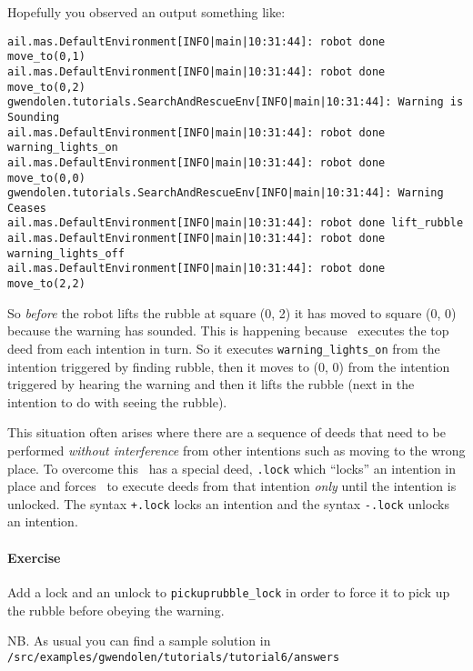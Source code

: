 \pagebreak

Hopefully you observed an output something like:
\begin{verbatim}
ail.mas.DefaultEnvironment[INFO|main|10:31:44]: robot done move_to(0,1) 
ail.mas.DefaultEnvironment[INFO|main|10:31:44]: robot done move_to(0,2) 
gwendolen.tutorials.SearchAndRescueEnv[INFO|main|10:31:44]: Warning is Sounding 
ail.mas.DefaultEnvironment[INFO|main|10:31:44]: robot done warning_lights_on 
ail.mas.DefaultEnvironment[INFO|main|10:31:44]: robot done move_to(0,0) 
gwendolen.tutorials.SearchAndRescueEnv[INFO|main|10:31:44]: Warning Ceases 
ail.mas.DefaultEnvironment[INFO|main|10:31:44]: robot done lift_rubble 
ail.mas.DefaultEnvironment[INFO|main|10:31:44]: robot done warning_lights_off 
ail.mas.DefaultEnvironment[INFO|main|10:31:44]: robot done move_to(2,2) 
\end{verbatim}
So \emph{before} the robot lifts the rubble at square (0, 2) it has moved to square (0, 0) because the warning has sounded.  This is happening because \gwendolen\ executes the top deed from each intention in turn.  So it executes \lstinline{warning_lights_on} from the intention triggered by finding rubble, then it moves to (0, 0) from the intention triggered by hearing the warning and then it lifts the rubble (next in the intention to do with seeing the rubble).

This situation often arises where there are a sequence of deeds that need to be performed \emph{without interference} from other intentions such as moving to the wrong place.  To overcome this \gwendolen\ has a special deed, \lstinline{.lock} which ``locks'' an intention in place and forces \gwendolen\ to execute deeds from that intention \emph{only} until the intention is unlocked.  The syntax \lstinline{+.lock} locks an intention and the syntax \lstinline{-.lock} unlocks an intention.

\paragraph{Exercise} Add a lock and an unlock to \verb+pickuprubble_lock+ in order to force it to pick up the rubble before obeying the warning.

\begin{sloppypar}
NB. As usual you can find a sample solution in \texttt{/src/examples/gwendolen/tutorials/tutorial6/answers}
\end{sloppypar}

